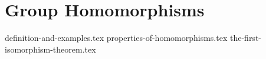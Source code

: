 \chapter{Group Homomorphisms}
{definition-and-examples.tex}
{properties-of-homomorphisms.tex}
{the-first-isomorphism-theorem.tex}
